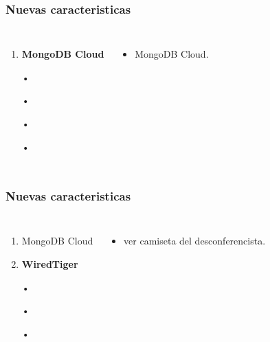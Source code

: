 \documentclass{beamer}
\begin{document}
\begin{frame}
\frametitle{Nuevas caracteristicas}
\begin{columns}[c] %

\begin{enumerate}
\item \textbf{MongoDB Cloud}
\item[•]	
\item[•]	
\item[•]	
\item[•]	
\end{enumerate}

\begin{itemize}
\item MongoDB Cloud.
\end{itemize}

\end{columns}
\end{frame}

\begin{frame}
\frametitle{Nuevas caracteristicas}
\begin{columns}[c] %

\begin{enumerate}
\item MongoDB Cloud
\item \textbf{WiredTiger}
\item[•]	
\item[•]	
\item[•]	
\end{enumerate}

\begin{itemize}
\item ver camiseta del desconferencista.
\end{itemize}

\end{columns}
\end{frame}
\end{document}
